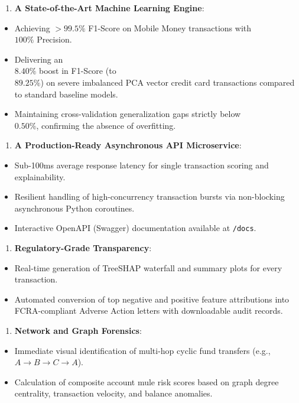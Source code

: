 \documentclass[12pt,a4paper,oneside]{report}
\begin{document}
\begin{enumerate}[leftmargin=0.35in]
\item \textbf{A State-of-the-Art Machine Learning Engine}:
\end{enumerate}
\begin{itemize}[leftmargin=0.35in]
\item Achieving $> 99.5\%$ F1-Score on Mobile Money transactions with \\$100\%$ Precision.
\item Delivering an \\$8.40\%$ boost in F1-Score (to \\$89.25\%$) on severe imbalanced PCA vector credit card transactions compared to standard baseline models.
\item Maintaining cross-validation generalization gaps strictly below \\$0.50\%$, confirming the absence of overfitting.
\end{itemize}

\begin{enumerate}[leftmargin=0.35in]
\item \textbf{A Production-Ready Asynchronous API Microservice}:
\end{enumerate}
\begin{itemize}[leftmargin=0.35in]
\item Sub-100ms average response latency for single transaction scoring and explainability.
\item Resilient handling of high-concurrency transaction bursts via non-blocking asynchronous Python coroutines.
\item Interactive OpenAPI (Swagger) documentation available at \texttt{/docs}.
\end{itemize}

\begin{enumerate}[leftmargin=0.35in]
\item \textbf{Regulatory-Grade Transparency}:
\end{enumerate}
\begin{itemize}[leftmargin=0.35in]
\item Real-time generation of TreeSHAP waterfall and summary plots for every transaction.
\item Automated conversion of top negative and positive feature attributions into FCRA-compliant Adverse Action letters with downloadable audit records.
\end{itemize}

\begin{enumerate}[leftmargin=0.35in]
\item \textbf{Network and Graph Forensics}:
\end{enumerate}
\begin{itemize}[leftmargin=0.35in]
\item Immediate visual identification of multi-hop cyclic fund transfers (e.g., $A \rightarrow B \rightarrow C \rightarrow A$).
\item Calculation of composite account mule risk scores based on graph degree centrality, transaction velocity, and balance anomalies.
\end{itemize}
\end{document}

